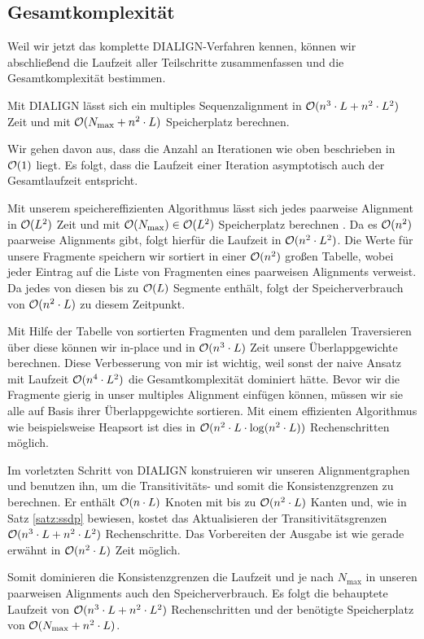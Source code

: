 \subsection{Gesamtkomplexität}

Weil wir jetzt das komplette DIALIGN-Verfahren kennen, können wir abschließend die Laufzeit aller Teilschritte zusammenfassen und die Gesamtkomplexität bestimmen.

\begin{korollar}
	Mit DIALIGN	lässt sich ein multiples Sequenzalignment in $\mathcal{O}(n^3\cdot L + n^2\cdot L^2)$ Zeit und mit $\mathcal{O}(N_{\max} + n^2\cdot L)$ Speicherplatz berechnen.
\end{korollar}

\begin{beweis}
	Wir gehen davon aus, dass die Anzahl an Iterationen wie oben beschrieben in $\mathcal{O}(1)$ liegt. Es folgt, dass die Laufzeit einer Iteration asymptotisch auch der Gesamtlaufzeit entspricht. 
	
	Mit unserem speichereffizienten Algorithmus lässt sich jedes paarweise Alignment in $\mathcal{O}(L^2)$ Zeit und mit $\mathcal{O}(N_{\max}) \in \mathcal{O}(L^2)$ Speicherplatz berechnen \cite{m02}. Da es $\mathcal{O}(n^2)$ paarweise Alignments gibt, folgt hierfür die Laufzeit in $\mathcal{O}(n^2\cdot L^2)$. Die Werte für unsere Fragmente speichern wir sortiert in einer $\mathcal{O}(n^2)$ großen Tabelle, wobei jeder Eintrag auf die Liste von Fragmenten eines paarweisen Alignments verweist. Da jedes von diesen bis zu $\mathcal{O}(L)$ Segmente enthält, folgt der Speicherverbrauch von $\mathcal{O}(n^2\cdot L)$ zu diesem Zeitpunkt.
	
	Mit Hilfe der Tabelle von sortierten Fragmenten und dem parallelen Traversieren über diese können wir in-place und in $\mathcal{O}(n^3\cdot L)$ Zeit unsere Überlappgewichte berechnen. Diese Verbesserung von mir ist wichtig, weil sonst der naive Ansatz mit Laufzeit $\mathcal{O}(n^4\cdot L^2)$ die Gesamtkomplexität dominiert hätte\cite{m99}. Bevor wir die Fragmente gierig in unser multiples Alignment einfügen können, müssen wir sie alle auf Basis ihrer Überlappgewichte sortieren. Mit einem effizienten Algorithmus wie beispielsweise Heapsort ist dies in $\mathcal{O}(n^2\cdot L\cdot \log(n^2\cdot L))$ Rechenschritten möglich. 
	
	Im vorletzten Schritt von DIALIGN konstruieren wir unseren Alignmentgraphen und benutzen ihn, um die Transitivitäts- und somit die Konsistenzgrenzen zu berechnen. Er enthält $\mathcal{O}(n\cdot L)$ Knoten mit bis zu $\mathcal{O}(n^2\cdot L)$ Kanten und, wie in Satz \ref{satz:ssdp} bewiesen, kostet das Aktualisieren der Transitivitätsgrenzen $\mathcal{O}(n^3\cdot L + n^2\cdot L^2)$ Rechenschritte. Das Vorbereiten der Ausgabe ist wie gerade erwähnt in $\mathcal{O}(n^2\cdot L)$ Zeit möglich.
	
	Somit dominieren die Konsistenzgrenzen die Laufzeit und je nach $N_{\max}$ in unseren paarweisen Alignments auch den Speicherverbrauch. Es folgt die behauptete Laufzeit von $\mathcal{O}(n^3\cdot L + n^2\cdot L^2)$ Rechenschritten und der benötigte Speicherplatz von $\mathcal{O}(N_{\max} + n^2\cdot L)$. 
\end{beweis}

